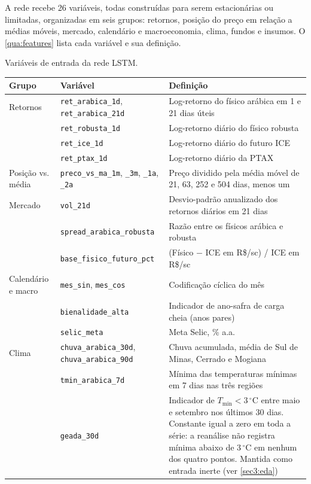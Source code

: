 A rede recebe 26 variáveis, todas construídas para serem estacionárias ou limitadas, organizadas em seis grupos: retornos, posição do preço em relação a médias móveis, mercado, calendário e macroeconomia, clima, fundos e insumos. O \autoref{qua:features} lista cada variável e sua definição.

\begin{quadro}[htb]
	\centering
	\caption{Variáveis de entrada da rede LSTM.}\label{qua:features}
	\begin{tabular}{L{2.4cm} L{4.2cm} L{7.8cm}}
		\hline
		\textbf{Grupo} & \textbf{Variável} & \textbf{Definição} \\ \hline
		Retornos & \texttt{ret\_arabica\_1d}, \texttt{ret\_arabica\_21d} & Log-retorno do físico arábica em 1 e 21 dias úteis \\
		& \texttt{ret\_robusta\_1d} & Log-retorno diário do físico robusta \\
		& \texttt{ret\_ice\_1d} & Log-retorno diário do futuro ICE \\
		& \texttt{ret\_ptax\_1d} & Log-retorno diário da PTAX \\
		Posição vs. média & \texttt{preco\_vs\_ma\_1m}, \texttt{\_3m}, \texttt{\_1a}, \texttt{\_2a} & Preço dividido pela média móvel de 21, 63, 252 e 504 dias, menos um \\
		Mercado & \texttt{vol\_21d} & Desvio-padrão anualizado dos retornos diários em 21 dias \\
		& \texttt{spread\_arabica\_robusta} & Razão entre os físicos arábica e robusta \\
		& \texttt{base\_fisico\_futuro\_pct} & (Físico $-$ ICE em R\$/sc) / ICE em R\$/sc \\
		Calendário e macro & \texttt{mes\_sin}, \texttt{mes\_cos} & Codificação cíclica do mês \\
		& \texttt{bienalidade\_alta} & Indicador de ano-safra de carga cheia (anos pares) \\
		& \texttt{selic\_meta} & Meta Selic, \% a.a. \\
		Clima & \texttt{chuva\_arabica\_30d}, \texttt{chuva\_arabica\_90d} & Chuva acumulada, média de Sul de Minas, Cerrado e Mogiana \\
		& \texttt{tmin\_arabica\_7d} & Mínima das temperaturas mínimas em 7 dias nas três regiões \\
		& \texttt{geada\_30d} & Indicador de $T_{\min} < 3\,^{\circ}$C entre maio e setembro nos últimos 30 dias. Constante igual a zero em toda a série: a reanálise não registra mínima abaixo de 3\,$^{\circ}$C em nenhum dos quatro pontos. Mantida como entrada inerte (ver \autoref{sec3:eda}) \\

\end{tabular}
\end{quadro}
